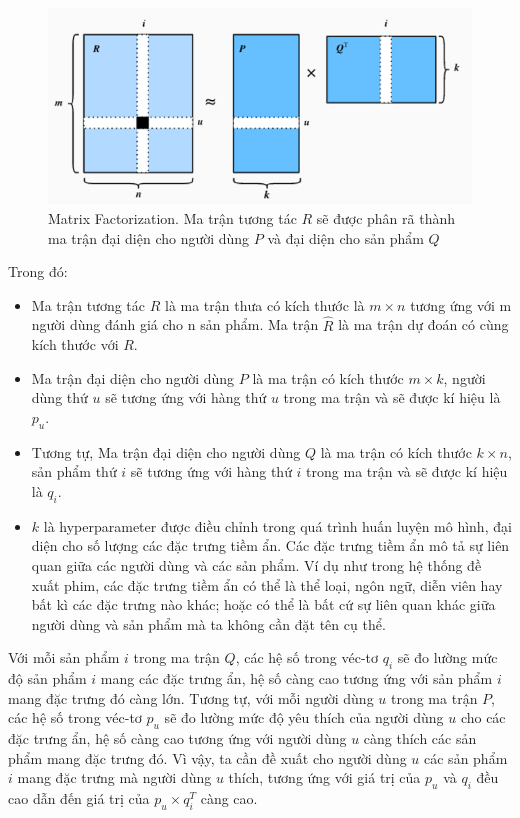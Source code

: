 \begin{figure}[h]
    \centering
    \includegraphics[width = \textwidth]{images/Chapter2/MF1.png}
    \caption{Matrix Factorization. Ma trận tương tác $R$ sẽ được phân rã thành ma trận đại diện cho người dùng $P$ và đại diện cho sản phẩm $Q$}
    \label{fig:chap2_MF1}
\end{figure}
Trong đó:
\begin{itemize}
    \item Ma trận tương tác $R$ là ma trận thưa có kích thước là $m \times n$ tương ứng với m người dùng đánh giá cho n sản phẩm. Ma trận $\hat{R}$ là ma trận dự đoán có cùng kích thước với $R$.
    \item Ma trận đại diện cho người dùng $P$ là ma trận có kích thước $m \times k$, người dùng thứ $u$ sẽ tương ứng với hàng thứ $u$ trong ma trận và sẽ được kí hiệu là $p_u$. 
    \item Tương tự, Ma trận đại diện cho người dùng $Q$ là ma trận có kích thước $k \times n$, sản phẩm thứ $i$ sẽ tương ứng với hàng thứ $i$ trong ma trận và sẽ được kí hiệu là $q_i$.
    \item $k$ là hyperparameter được điều chỉnh trong quá trình huấn luyện mô hình, đại diện cho số lượng các đặc trưng tiềm ẩn. Các đặc trưng tiềm ẩn mô tả sự liên quan giữa các người dùng và các sản phẩm. Ví dụ như trong hệ thống đề xuất phim, các đặc trưng tiềm ẩn có thể là thể loại, ngôn ngữ, diễn viên hay bất kì các đặc trưng nào khác; hoặc có thể là bất cứ sự liên quan khác giữa người dùng và sản phẩm mà ta không cần đặt tên cụ thể.
\end{itemize}
Với mỗi sản phẩm $i$ trong ma trận $Q$, các hệ số trong véc-tơ $q_i$ sẽ đo lường mức độ sản phẩm $i$ mang các đặc trưng ẩn, hệ số càng cao tương ứng với sản phẩm $i$ mang đặc trưng đó càng lớn. Tương tự, với mỗi người dùng $u$ trong ma trận $P$, các hệ số trong véc-tơ $p_u$ sẽ đo lường mức độ yêu thích của người dùng $u$ cho các đặc trưng ẩn, hệ số càng cao tương ứng với người dùng $u$ càng thích các sản phẩm mang đặc trưng đó.
Vì vậy, ta cần đề xuất cho người dùng $u$ các sản phẩm $i$ mang đặc trưng mà người dùng $u$ thích, tương ứng với giá trị của $p_u$ và $q_i$ đều cao dẫn đến giá trị của 
$p_u\times q_{i}^T$ càng cao.

